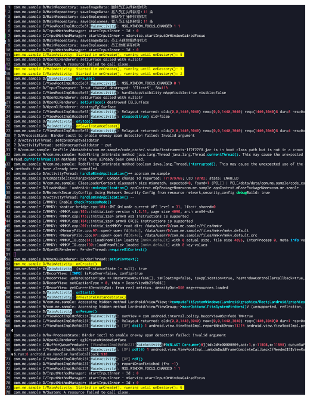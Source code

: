 \documentclass[9pt, b5paper]{article}
\begin{document}
\includegraphics[width=.9\linewidth]{./pic/readme_20220915_225835.png}
\end{document}
